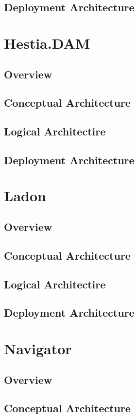 \documentclass[a4paper]{book}
\begin{document}
\section{Deployment Architecture}

\chapter{Hestia.DAM}
\section{Overview}
\section{Conceptual Architecture}
\section{Logical Architectire}
\section{Deployment Architecture}

\chapter{Ladon}
\section{Overview}
\section{Conceptual Architecture}
\section{Logical Architectire}
\section{Deployment Architecture}

\chapter{Navigator}
\section{Overview}
\section{Conceptual Architecture}
\end{document}
